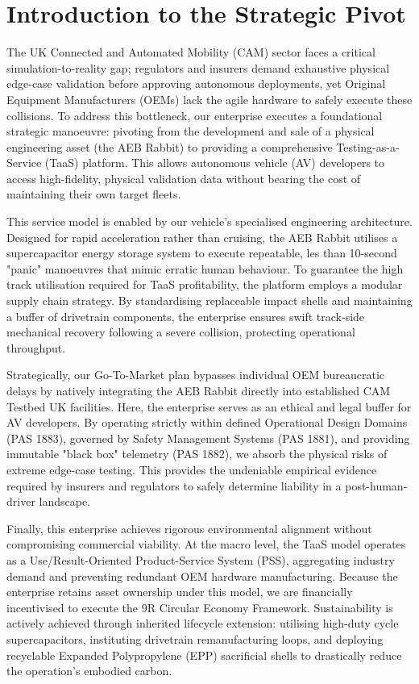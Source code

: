 
\section{Introduction to the Strategic Pivot}

The UK Connected and Automated Mobility (CAM) sector faces a critical simulation-to-reality gap; regulators and insurers demand exhaustive physical edge-case validation before approving autonomous deployments, yet Original Equipment Manufacturers (OEMs) lack the agile hardware to safely execute these collisions. To address this bottleneck, our enterprise executes a foundational strategic manoeuvre: pivoting from the development and sale of a physical engineering asset (the AEB Rabbit) to providing a comprehensive Testing-as-a-Service (TaaS) platform. This allows autonomous vehicle (AV) developers to access high-fidelity, physical validation data without bearing the cost of maintaining their own target fleets.

This service model is enabled by our vehicle's specialised engineering architecture. Designed for rapid acceleration rather than cruising, the AEB Rabbit utilises a supercapacitor energy storage system to execute repeatable,  les than 10-second "panic" manoeuvres that mimic erratic human behaviour. To guarantee the high track utilisation required for TaaS profitability, the platform employs a modular supply chain strategy. By standardising replaceable impact shells and maintaining a buffer of drivetrain components, the enterprise ensures swift track-side mechanical recovery following a severe collision, protecting operational throughput.

Strategically, our Go-To-Market plan bypasses individual OEM bureaucratic delays by natively integrating the AEB Rabbit directly into established CAM Testbed UK facilities. Here, the enterprise serves as an ethical and legal buffer for AV developers. By operating strictly within defined Operational Design Domains (PAS 1883), governed by Safety Management Systems (PAS 1881), and providing immutable "black box" telemetry (PAS 1882), we absorb the physical risks of extreme edge-case testing. This provides the undeniable empirical evidence required by insurers and regulators to safely determine liability in a post-human-driver landscape.

Finally, this enterprise achieves rigorous environmental alignment without compromising commercial viability. At the macro level, the TaaS model operates as a Use/Result-Oriented Product-Service System (PSS), aggregating industry demand and preventing redundant OEM hardware manufacturing. Because the enterprise retains asset ownership under this model, we are financially incentivised to execute the 9R Circular Economy Framework. Sustainability is actively achieved through inherited lifecycle extension: utilising high-duty cycle supercapacitors, instituting drivetrain remanufacturing loops, and deploying recyclable Expanded Polypropylene (EPP) sacrificial shells to drastically reduce the operation's embodied carbon.

